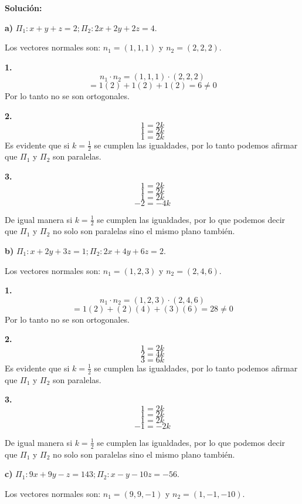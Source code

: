 \documentclass{article}
\begin{document}
\textbf{Solución:}
\vspace{10pt}

\textbf{a)} $\Pi_1 :x+y+z=2;\Pi_2 :2x+2y+2z=4$.
\vspace{10pt}

Los vectores normales son: $n_1 =(1,1,1)$ y $n_2=(2,2,2)$. 
\vspace{10pt}

\textbf{1.}
$$n_1 \cdot n_2 = (1,1,1)\cdot (2,2,2)$$
$$ =1(2)+1(2)+1(2)=6 \neq 0$$
Por lo tanto no se son ortogonales.
\vspace*{10pt}

\textbf{2.}
$$1 = 2k$$
$$1 = 2k$$
$$1 = 2k$$
Es evidente que si $k = \frac{1}{2} $ se cumplen las igualdades, por lo tanto podemos afirmar que $\Pi_1$ y $\Pi_2$ son paralelas. 
\vspace{10pt}

\textbf{3.}
$$1 = 2k$$
$$1 = 2k$$
$$1 = 2k$$
$$-2 = -4k$$

De igual manera si $k = \frac{1}{2}$ se cumplen las igualdades, por lo que podemos decir que $\Pi_1$ y $\Pi_2$ no solo son paralelas 
sino el mismo plano también.
\vspace*{10pt}

\textbf{b)} $\Pi_1 :x+2y+3z=1;\Pi_2 :2x+4y+6z=2$.
\vspace{10pt}

Los vectores normales son: $n_1 =(1,2,3)$ y $n_2=(2,4,6)$.
\vspace{10pt}

\textbf{1.}
$$n_1 \cdot n_2 = (1,2,3)\cdot (2,4,6)$$
$$ =1(2)+(2)(4)+(3)(6)=28 \neq 0$$
Por lo tanto no se son ortogonales.
\vspace*{10pt}

\textbf{2.}
$$1 = 2k$$
$$2 = 4k$$
$$3 = 6k$$
Es evidente que si $k = \frac{1}{2} $ se cumplen las igualdades, por lo tanto podemos afirmar que $\Pi_1$ y $\Pi_2$ son paralelas. 
\vspace{10pt}

\textbf{3.}
$$1 = 2k$$
$$1 = 2k$$
$$1 = 2k$$
$$-1 = -2k$$

De igual manera si $k = \frac{1}{2}$ se cumplen las igualdades, por lo que podemos decir que $\Pi_1$ y $\Pi_2$ no solo son paralelas 
sino el mismo plano también.
\vspace*{10pt}

\textbf{c)} $\Pi_1 :9x+9y-z=143;\Pi_2 :x-y-10z=-56$.
\vspace{10pt}

Los vectores normales son: $n_1 =(9,9,-1)$ y $n_2=(1,-1,-10)$. 
\vspace{10pt}
\end{document}
